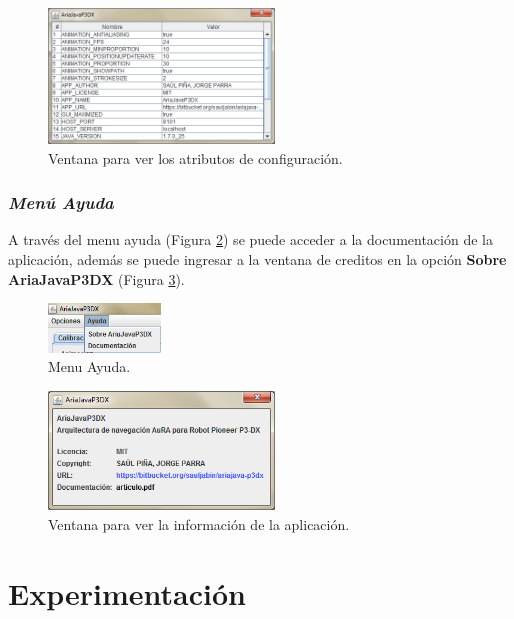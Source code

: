 \documentclass[11pt,twoside,A5]{article}
\newcommand{\reffigure}[1]{Figura \ref{#1}}
\newcommand{\refpfigure}[1]{(\reffigure{#1})}
\begin{document}
\begin{figure}[H]
\begin{center}
\includegraphics[width=6cm]{ver-configuracion.png} 
\caption{Ventana para ver los atributos de configuración.}
\label{fig:ver-configuracion}
\end{center}
\end{figure} 

\subsubsection*{\textit{Menú Ayuda}}

A través del menu ayuda \refpfigure{fig:menu-ayuda} se puede acceder a la documentación de 
la aplicación, además se puede ingresar a la ventana de creditos en la opción \textbf{Sobre AriaJavaP3DX} \refpfigure{fig:ventana-about}.

\begin{figure}[H]
\begin{center}
\includegraphics[width=3cm]{menu-ayuda2.png} 
\caption{Menu Ayuda.}
\label{fig:menu-ayuda}
\end{center}
\end{figure} 

\begin{figure}[H]
\begin{center}
\includegraphics[width=6cm]{ventana-about.png} 
\caption{Ventana para ver la información de la aplicación.}
\label{fig:ventana-about}
\end{center}
\end{figure} 

\section*{Experimentación}
\end{document}
